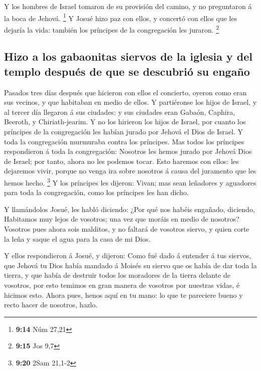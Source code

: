  Y los hombres de Israel tomaron de su provisión del
camino, y no preguntaron á la boca de Jehová. \footnote{\textbf{9:14}
  Núm 27,21}  Y Josué hizo paz con ellos, y concertó con
ellos que les dejaría la vida: también los príncipes de la congregación
les juraron. \footnote{\textbf{9:15} Jos 9,7}

\hypertarget{hizo-a-los-gabaonitas-siervos-de-la-iglesia-y-del-templo-despuuxe9s-de-que-se-descubriuxf3-su-engauxf1o}{%
\subsection{Hizo a los gabaonitas siervos de la iglesia y del templo
después de que se descubrió su
engaño}\label{hizo-a-los-gabaonitas-siervos-de-la-iglesia-y-del-templo-despuuxe9s-de-que-se-descubriuxf3-su-engauxf1o}}

 Pasados tres días después que hicieron con ellos el
concierto, oyeron como eran sus vecinos, y que habitaban en medio de
ellos.  Y partiéronse los hijos de Israel, y al tercer
día llegaron á sus ciudades: y sus ciudades eran Gabaón, Caphira,
Beeroth, y Chiriath-jearim.  Y no los hirieron los hijos
de Israel, por cuanto los príncipes de la congregación les habían jurado
por Jehová el Dios de Israel. Y toda la congregación murmuraba contra
los príncipes.  Mas todos los príncipes respondieron á
toda la congregación: Nosotros les hemos jurado por Jehová Dios de
Israel; por tanto, ahora no les podemos tocar.  Esto
haremos con ellos: les dejaremos vivir, porque no venga ira sobre
nosotros á causa del juramento que les hemos hecho. \footnote{\textbf{9:20}
  2Sam 21,1-2}  Y los príncipes les dijeron: Vivan; mas
sean leñadores y aguadores para toda la congregación, como los príncipes
les han dicho.

 Y llamándolos Josué, les habló diciendo: ¿Por qué nos
habéis engañado, diciendo, Habitamos muy lejos de vosotros; una vez que
moráis en medio de nosotros?  Vosotros pues ahora sois
malditos, y no faltará de vosotros siervo, y quien corte la leña y saque
el agua para la casa de mi Dios.

 Y ellos respondieron á Josué, y dijeron: Como fué dado á
entender á tus siervos, que Jehová tu Dios había mandado á Moisés su
siervo que os había de dar toda la tierra, y que había de destruir todos
los moradores de la tierra delante de vosotros, por esto temimos en gran
manera de vosotros por nuestras vidas, é hicimos esto. 
Ahora pues, henos aquí en tu mano: lo que te pareciere bueno y recto
hacer de nosotros, hazlo.

